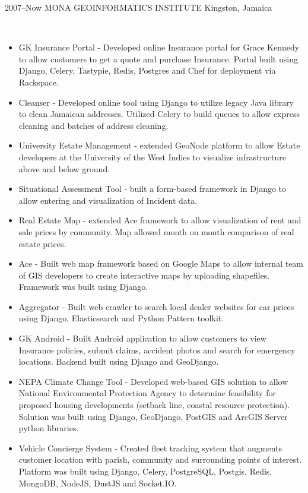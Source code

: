 \documentclass[]{cv-style}          %
\begin{document}
\begin{entrylist}
\entry
  {2007--Now}
  {MONA GEOINFORMATICS INSTITUTE}
  {Kingston, Jamaica}
  {\\  
\begin{itemize}
\item GK Insurance Portal - Developed online Insurance portal for Grace Kennedy to allow customers to get a quote and purchase Insurance. Portal built using Django, Celery, Tastypie, Redis, Postgres and Chef for deployment via Rackspace.
\item Cleanser - Developed online tool using Django to utilize legacy Java library to clean Jamaican addresses. Utilized Celery to build queues to allow express cleaning and batches of address cleaning.
\item University Estate Management - extended GeoNode platform to allow Estate developers at the University of the West Indies to visualize infrastructure above and below ground.  
\item Situational Assessment Tool - built a form-based framework in Django to allow entering and visualization of Incident data. 
\item Real Estate Map - extended Ace framework to allow visualization of rent and sale prices by community. Map allowed month on month comparison of real estate prices. 
\item Ace - Built web map framework based on Google Maps to allow internal team of GIS developers to create interactive maps by uploading shapefiles. Framework was built using Django.
\item Aggregator - Built web crawler to search local dealer websites for car prices using Django, Elasticsearch and Python Pattern toolkit. 
\item GK Android - Built Android application to allow customers to view Insurance policies, submit claims, accident photos and search for emergency locations. Backend built using Django and GeoDjango.
\item NEPA Climate Change Tool - Developed web-based GIS solution to allow National Environmental Protection Agency to determine feasibility for proposed housing developments (setback line, coastal resource protection). Solution was built using Django, GeoDjango, PostGIS and ArcGIS Server python libraries.
\item Vehicle Concierge System - Created fleet tracking system that augments customer location with parish, community and surrounding points of interest. Platform was built using Django, Celery, PostgreSQL, Postgis, Redis, MongoDB, NodeJS, DustJS and Socket.IO. 

\end{itemize}}
\end{entrylist}
\end{document}

